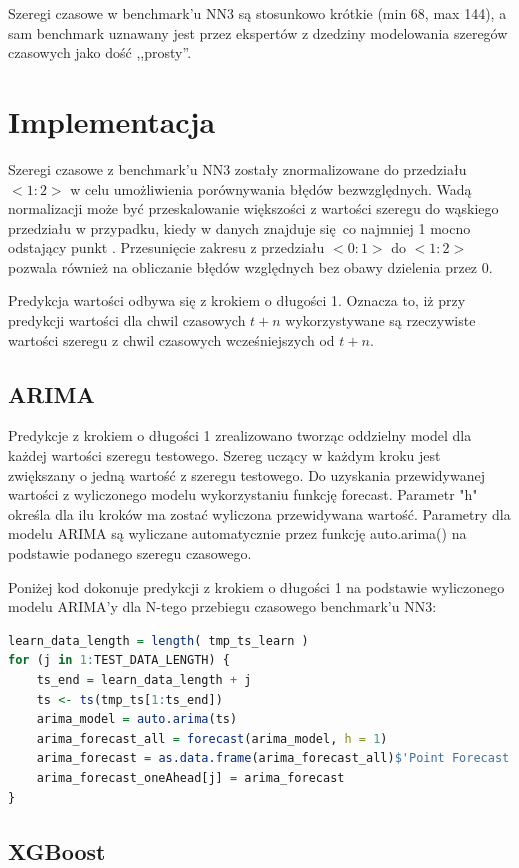 \documentclass[11pt]{report}
\begin{document}
Szeregi czasowe w benchmark'u NN3 są stosunkowo krótkie (min 68, max 144), a sam benchmark uznawany jest przez ekspertów z dzedziny modelowania szeregów czasowych jako dość ,,prosty''.

\section{Implementacja}

Szeregi czasowe z benchmark'u NN3 zostały znormalizowane do przedziału $<1:2>$ w celu umożliwienia porównywania błędów bezwzględnych.
Wadą normalizacji może być przeskalowanie większości z wartości szeregu do wąskiego przedziału w przypadku, kiedy w danych znajduje się co najmniej 1 mocno odstający punkt \cite{noauthor_standardization_nodate}.
Przesunięcie zakresu z przedziału $<0:1>$ do $<1:2>$ pozwala również na obliczanie błędów względnych bez obawy dzielenia przez 0.

Predykcja wartości odbywa się z krokiem o długości 1.
Oznacza to, iż przy predykcji wartości dla chwil czasowych $t+n$ wykorzystywane są rzeczywiste wartości szeregu z chwil czasowych wcześniejszych od $t+n$.

\subsection{ARIMA}
Predykcje z krokiem o długości 1 zrealizowano tworząc oddzielny model dla każdej wartości szeregu testowego. Szereg uczący w każdym kroku jest zwiększany o jedną wartość z szeregu testowego.
Do uzyskania przewidywanej wartości z wyliczonego modelu wykorzystaniu funkcję forecast. Parametr "h" określa dla ilu kroków ma zostać wyliczona przewidywana wartość.
Parametry dla modelu ARIMA są wyliczane automatycznie przez funkcję auto.arima() na podstawie podanego szeregu czasowego.

Poniżej kod dokonuje predykcji z krokiem o długości 1 na podstawie wyliczonego modelu ARIMA'y dla N-tego przebiegu czasowego benchmark'u NN3:
\begin{lstlisting}[language=R]
learn_data_length = length( tmp_ts_learn )
for (j in 1:TEST_DATA_LENGTH) {
    ts_end = learn_data_length + j
    ts <- ts(tmp_ts[1:ts_end])
    arima_model = auto.arima(ts)
    arima_forecast_all = forecast(arima_model, h = 1)
    arima_forecast = as.data.frame(arima_forecast_all)$'Point Forecast'
    arima_forecast_oneAhead[j] = arima_forecast
}
\end{lstlisting}

\subsection{XGBoost}
\end{document}
